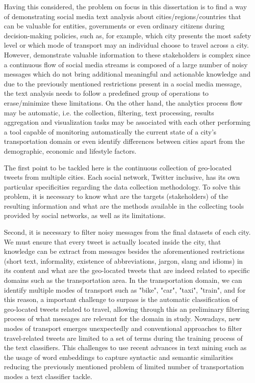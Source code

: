Having this considered, the problem on focus in this dissertation is to find a way of demonstrating social media text analysis about cities/regions/countries that can be valuable for entities, governments or even ordinary citizens during decision-making policies, such as, for example, which city presents the most safety level or which mode of transport may an individual choose to travel across a city. However, demonstrate valuable information to these stakeholders is complex since a continuous flow of social media streams is composed of a large number of noisy messages which do not bring additional meaningful and actionable knowledge and due to the previously mentioned restrictions present in a social media message, the text analysis needs to follow a predefined group of operations to erase/minimize these limitations. On the other hand, the analytics process flow may be automatic, i.e. the collection, filtering, text processing, results aggregation and visualization tasks may be associated with each other performing a tool capable of monitoring automatically the current state of a city's transportation domain or even identify differences between cities apart from the demographic, economic and lifestyle factors.

The first point to be tackled here is the continuous collection of geo-located tweets from multiple cities. Each social network, Twitter inclusive, has its own particular specificities regarding the data collection methodology. To solve this problem, it is necessary to know what are the targets (stakeholders) of the resulting information and what are the methods available in the collecting tools provided by social networks, as well as its limitations.

Second, it is necessary to filter noisy messages from the final datasets of each city. We must ensure that every tweet is actually located inside the city, that knowledge can be extract from messages besides the aforementioned restrictions (short text, informality, existence of abbreviations, jargon, slang and idioms) in its content and what are the geo-located tweets that are indeed related to specific domains such as the transportation area. In the transportation domain, we can identify multiple modes of transport such as "bike", "car", "taxi", "train", and for this reason, a important challenge to surpass is the automatic classification of geo-located tweets related to travel, allowing through this an preliminary filtering process of what messages are relevant for the domain in study. Nowadays, new modes of transport emerges unexpectedly and conventional approaches to filter travel-related tweets are limited to a set of terms during the training process of the text classifiers. This challenges to use recent advances in text mining such as the usage of word embeddings to capture syntactic and semantic similarities reducing the previously mentioned problem of limited number of transportation modes a text classifier tackle.

